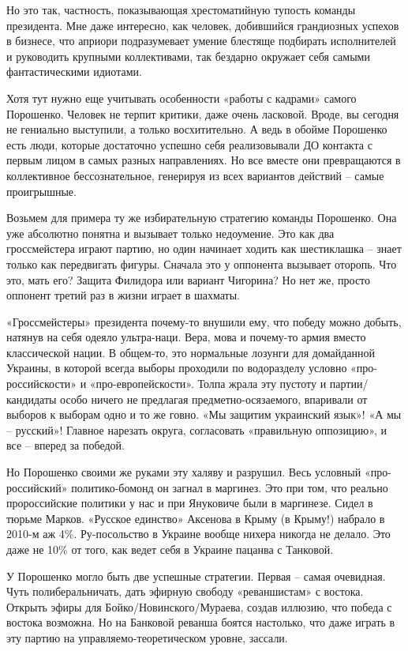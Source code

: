 Но это так, частность, показывающая хрестоматийную тупость команды президента.
Мне даже интересно, как человек, добившийся грандиозных успехов в бизнесе, что
априори подразумевает умение блестяще подбирать исполнителей и руководить
крупными коллективами, так бездарно окружает себя самыми фантастическими
идиотами.

Хотя тут нужно еще учитывать особенности «работы с кадрами» самого Порошенко.
Человек не терпит критики, даже очень ласковой. Вроде, вы сегодня не гениально
выступили, а только восхитительно. А ведь в обойме Порошенко есть люди, которые
достаточно успешно себя реализовывали ДО контакта с первым лицом в самых разных
направлениях. Но все вместе они превращаются в коллективное бессознательное,
генерируя из всех вариантов действий – самые проигрышные.

Возьмем для примера ту же избирательную стратегию команды Порошенко. Она уже
абсолютно понятна и вызывает только недоумение. Это как два гроссмейстера
играют партию, но один начинает ходить как шестиклашка – знает только как
передвигать фигуры. Сначала это у оппонента вызывает оторопь. Что это, мать
его? Защита Филидора или вариант Чигорина? Но нет же, просто оппонент третий
раз в жизни играет в шахматы.

«Гроссмейстеры» президента почему-то внушили ему, что победу можно добыть,
натянув на себя одеяло ультра-наци. Вера, мова и почему-то армия вместо
классической нации. В общем-то, это нормальные лозунги для домайданной Украины,
в которой всегда выборы проходили по водоразделу условно «про-российскости» и
«про-европейскости». Толпа жрала эту пустоту и партии/кандидаты особо ничего не
предлагая предметно-осязаемого, впаривали от выборов к выборам одно и то же
говно. «Мы защитим украинский язык»! «А мы – русский»! Главное нарезать округа,
согласовать «правильную оппозицию», и все – вперед за победой.

Но Порошенко своими же руками эту халяву и разрушил. Весь условный
«про-российский» политико-бомонд он загнал в маргинез. Это при том, что реально
пророссийские политики у нас и при Януковиче были в маргинезе. Сидел в тюрьме
Марков. «Русское единство» Аксенова в Крыму (в Крыму!) набрало в 2010-м аж 4\%.
Ру-посольство в Украине вообще нихера никогда не делало. Это даже не 10\% от
того, как ведет себя в Украине пацанва с Танковой.

У Порошенко могло быть две успешные стратегии. Первая – самая очевидная. Чуть
полиберальничать, дать эфирную свободу «реваншистам» с востока. Открыть эфиры
для Бойко/Новинского/Мураева, создав иллюзию, что победа с востока возможна. Но
на Банковой реванша боятся настолько, что даже играть в эту партию на
управляемо-теоретическом уровне, зассали.

